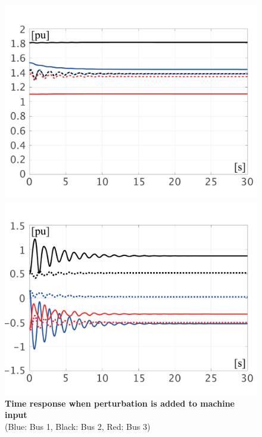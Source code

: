 \documentclass[graybox, envcountchap]{svmult}
\begin{document}
\begin{figure}[t]
{\begin{minipage}{0.49\linewidth}
    \includegraphics[width = 1.0\linewidth]{figs/EabsVP}
    \medskip
  \end{minipage}
  \begin{minipage}{0.49\linewidth}
    \centering
    \includegraphics[width = 1.0\linewidth]{figs/PQP}
    \medskip
  \end{minipage}
  }
  \medskip
  \caption{\textbf{Time response when perturbation is added to machine input}
  \\  \centering(Blue: Bus 1, Black: Bus 2, Red: Bus 3)}
  \label{fig:KronP}
\medskip
\end{figure}
\end{document}
